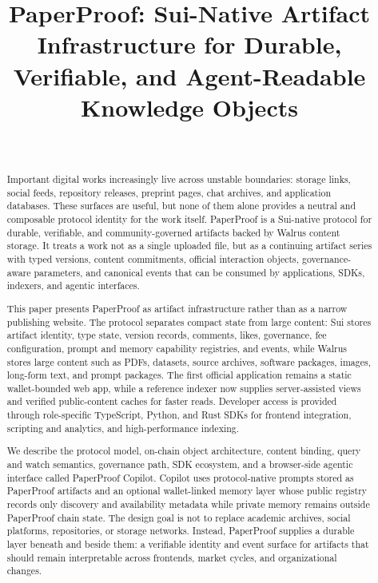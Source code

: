 \documentclass[journal]{IEEEtran}
\begin{document}
\title{PaperProof: Sui-Native Artifact Infrastructure for Durable, Verifiable, and Agent-Readable Knowledge Objects}

\author{\\
}

\maketitle

\begin{abstract}
Important digital works increasingly live across unstable boundaries: storage links, social feeds, repository releases, preprint pages, chat archives, and application databases. These surfaces are useful, but none of them alone provides a neutral and composable protocol identity for the work itself. PaperProof is a Sui-native protocol for durable, verifiable, and community-governed artifacts backed by Walrus content storage. It treats a work not as a single uploaded file, but as a continuing artifact series with typed versions, content commitments, official interaction objects, governance-aware parameters, and canonical events that can be consumed by applications, SDKs, indexers, and agentic interfaces.

This paper presents PaperProof as artifact infrastructure rather than as a narrow publishing website. The protocol separates compact state from large content: Sui stores artifact identity, type state, version records, comments, likes, governance, fee configuration, prompt and memory capability registries, and events, while Walrus stores large content such as PDFs, datasets, source archives, software packages, images, long-form text, and prompt packages. The first official application remains a static wallet-bounded web app, while a reference indexer now supplies server-assisted views and verified public-content caches for faster reads. Developer access is provided through role-specific TypeScript, Python, and Rust SDKs for frontend integration, scripting and analytics, and high-performance indexing.

We describe the protocol model, on-chain object architecture, content binding, query and watch semantics, governance path, SDK ecosystem, and a browser-side agentic interface called PaperProof Copilot. Copilot uses protocol-native prompts stored as PaperProof artifacts and an optional wallet-linked memory layer whose public registry records only discovery and availability metadata while private memory remains outside PaperProof chain state. The design goal is not to replace academic archives, social platforms, repositories, or storage networks. Instead, PaperProof supplies a durable layer beneath and beside them: a verifiable identity and event surface for artifacts that should remain interpretable across frontends, market cycles, and organizational changes.
\end{abstract}
\end{document}
